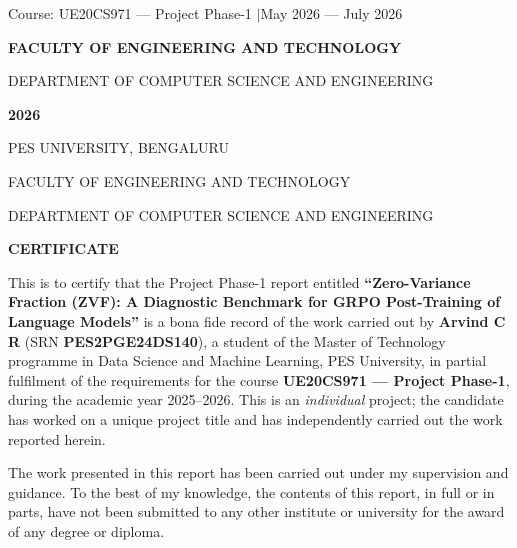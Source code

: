 \documentclass[12pt,a4paper]{report}
\begin{document}
\begin{titlepage}
\vfill

{\normalsize Course: UE20CS971 --- Project Phase-1 \quad$\vert$\quad May 2026 --- July 2026\par}
\vspace{0.3em}
{\large\bfseries FACULTY OF ENGINEERING AND TECHNOLOGY\par}
{\normalsize DEPARTMENT OF COMPUTER SCIENCE AND ENGINEERING\par}
\vspace{0.2em}
{\large\bfseries 2026\par}

\end{titlepage}

\thispagestyle{empty}
\begin{center}
{\large PES UNIVERSITY, BENGALURU\par}
{\normalsize FACULTY OF ENGINEERING AND TECHNOLOGY\par}
{\normalsize DEPARTMENT OF COMPUTER SCIENCE AND ENGINEERING\par}
\vspace{1.0em}
{\Large\bfseries CERTIFICATE\par}
\end{center}
\vspace{1.0em}

This is to certify that the Project Phase-1 report entitled
\textbf{``Zero-Variance Fraction (ZVF): A Diagnostic Benchmark for GRPO
Post-Training of Language Models''} is a bona fide record of the work carried out
by \textbf{Arvind C R} (SRN \textbf{PES2PGE24DS140}), a student of the Master of
Technology programme in Data Science and Machine Learning, PES University, in
partial fulfilment of the requirements for the course \textbf{UE20CS971 ---
Project Phase-1}, during the academic year 2025--2026. This is an
\emph{individual} project; the candidate has worked on a unique project title and
has independently carried out the work reported herein.

\vspace{0.6em}

The work presented in this report has been carried out under my supervision and
guidance. To the best of my knowledge, the contents of this report, in full or in
parts, have not been submitted to any other institute or university for the award
of any degree or diploma.
\end{document}
